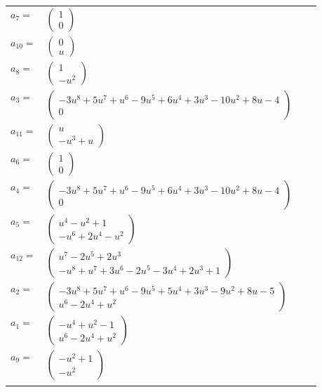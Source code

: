 \documentclass[1p]{elsarticle_modified}
\theoremstyle{definition}
\begin{document}
\begin{tabular}{m{7pt} m{180pt} m{7pt} m{180pt} }
\flushright $a_{7}=$&$\begin{pmatrix}1\\0\end{pmatrix}$ \\
\flushright $a_{10}=$&$\begin{pmatrix}0\\u\end{pmatrix}$ \\
\flushright $a_{8}=$&$\begin{pmatrix}1\\- u^2\end{pmatrix}$ \\
\flushright $a_{3}=$&$\begin{pmatrix}-3 u^8+5 u^7+u^6-9 u^5+6 u^4+3 u^3-10 u^2+8 u-4\\0\end{pmatrix}$ \\
\flushright $a_{11}=$&$\begin{pmatrix}u\\- u^3+u\end{pmatrix}$ \\
\flushright $a_{6}=$&$\begin{pmatrix}1\\0\end{pmatrix}$ \\
\flushright $a_{4}=$&$\begin{pmatrix}-3 u^8+5 u^7+u^6-9 u^5+6 u^4+3 u^3-10 u^2+8 u-4\\0\end{pmatrix}$ \\
\flushright $a_{5}=$&$\begin{pmatrix}u^4- u^2+1\\- u^6+2 u^4- u^2\end{pmatrix}$ \\
\flushright $a_{12}=$&$\begin{pmatrix}u^7-2 u^5+2 u^3\\- u^8+u^7+3 u^6-2 u^5-3 u^4+2 u^3+1\end{pmatrix}$ \\
\flushright $a_{2}=$&$\begin{pmatrix}-3 u^8+5 u^7+u^6-9 u^5+5 u^4+3 u^3-9 u^2+8 u-5\\u^6-2 u^4+u^2\end{pmatrix}$ \\
\flushright $a_{1}=$&$\begin{pmatrix}- u^4+u^2-1\\u^6-2 u^4+u^2\end{pmatrix}$ \\
\flushright $a_{9}=$&$\begin{pmatrix}- u^2+1\\- u^2\end{pmatrix}$\\&\end{tabular}
\end{document}
